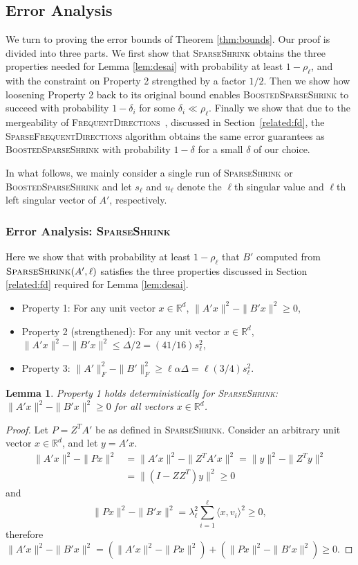 \documentclass[11pt]{article}
\newcommand{\R}{\mathbb{R}}
\newcommand{\fd}{\textsc{FrequentDirections}\xspace}
\newcommand{\sfd}{\textsc{SparseFrequentDirections}\xspace}
\newcommand{\SSh}{\textsc{SparseShrink}\xspace}
\newcommand{\BSSh}{\textsc{BoostedSparseShrink}\xspace}
\newtheorem{lemma}{Lemma}[section]
\newcommand{\denselist}{\itemsep -2pt\parsep=-1pt\partopsep -2pt}
\begin{document}
\subsection{Error Analysis}
\label{sec:error}

We turn to proving the error bounds of Theorem \ref{thm:bounds}.  
Our proof is divided into three parts.  
We first show that \SSh obtains the three properties needed for Lemma \ref{lem:desai} with probability at least $1-\rho_\ell$, and with the constraint on Property 2 strengthed by a factor $1/2$.
Then we show how loosening Property 2 back to its original bound enables \BSSh to succeed with probability $1-\delta_i$ for some $\delta_i \ll \rho_\ell$. 
Finally we show that due to the mergeability of \fd~\cite{Lib12}, discussed in Section~\ref{related:fd}, the \sfd algorithm obtains the same error guarantees as \BSSh with probability $1-\delta$ for a small $\delta$ of our choice. 


In what follows, we mainly consider a single run of \SSh or \BSSh and let $s_\ell$ and $u_\ell$ denote the $\ell$th singular value and $\ell$th left singular vector of $A'$, respectively.

\subsubsection{Error Analysis: \SSh} 

Here we show that with probability at least $1-\rho_\ell$ that $B'$ computed from $\SSh(A',\ell)$ satisfies the three properties discussed in Section \ref{related:fd} required for Lemma \ref{lem:desai}.  
\begin{itemize} \denselist
\item Property 1: For any unit vector $x\in\R^d$, $\|A'x\|^2 - \|B'x\|^2 \geq 0$,
\item Property 2 (strengthened): For any unit vector $x\in\R^d$, $\|A'x\|^2 - \|B'x\|^2 \leq \Delta/2 = (41/16) s_\ell^2$, 
\item Property 3: $\|A'\|_F^2 - \|B'\|_F^2 \geq \ell \alpha \Delta = \ell (3/4) s_\ell^2 $.
\end{itemize}


\label{subsub:SSh}
\begin{lemma} 
Property 1 holds deterministically for \SSh: $\|A' x\|^2 - \|B' x\|^2 \ge 0$ for all vectors $x\in\R^d$.
\end{lemma}
\begin{proof}
Let $P = Z^TA'$ be as defined in \SSh. Consider an arbitrary unit vector $x \in \R^d$, and let $y = A'x$.
\begin{align*}
\|A' x\|^2 - \|P x\|^2 &= \|A'x\|^2 - \|Z^T A'x\|^2 = \|y\|^2 - \|Z^Ty\|^2 \\
&= \|(I-ZZ^T)y\|^2 \geq 0
\end{align*}
and 
\[
\|P x\|^2 - \|B' x\|^2 = \lambda_\ell^2 \sum_{i=1}^\ell \langle x,v_i\rangle^2 \geq 0,
\]
therefore $\|A' x\|^2 - \|B' x\|^2 = (\|A' x\|^2 - \|P x\|^2) + (\|P x\|^2 - \|B' x\|^2) \geq 0$.
\end{proof}
\end{document}

